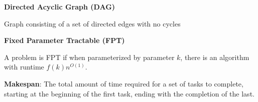 \Large
\textbf{Directed Acyclic Graph (DAG)}

Graph consisting of a set of directed edges with
no cycles

\textbf{Fixed Parameter Tractable (FPT)}

A problem is FPT if when parameterized by
parameter $k$, there is an algorithm with runtime $f(k) n^{O(1)}$.

\textbf{Makespan}: The total amount of time required for a set of tasks to complete,
starting at the beginning of the first task, ending with the completion of the
last.
